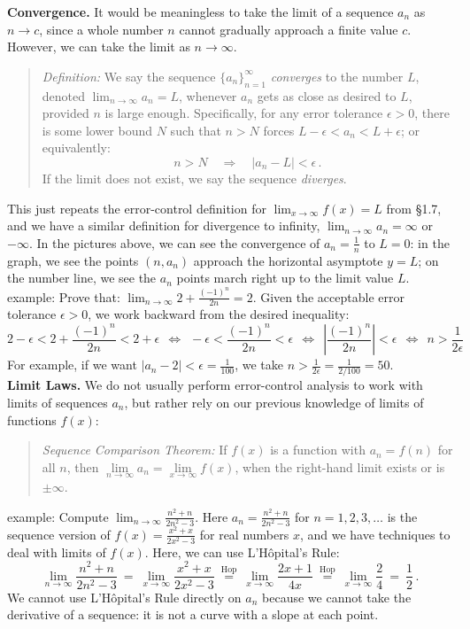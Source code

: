 \documentclass[11pt]{article}
\begin{document}
\noindent
{\bf Convergence.}  It would be meaningless to take the limit of a sequence $a_n$ as $n\to c$, since a whole number $n$ cannot gradually approach a finite value $c$. However, we can take the limit as $n\to\infty$.
\begin{quote}
{\it Definition:} We say the sequence $\{a_n\}_{n=1}^\infty$ {\it converges} to the number $L$, 
denoted $\lim_{n\to\infty} a_n = L$,
whenever $a_n$ gets as close as desired to $L$,
provided $n$ is large enough. 
Specifically, for any error tolerance $\epsilon>0$,
there is some lower bound $N$ such that
$n>N$ forces $L-\epsilon < a_n < L+\epsilon$;
or equivalently:
$$
n>N \quad\Longrightarrow\quad |a_n-L|<\epsilon\,.
$$
If the limit does not exist, we say the sequence {\it diverges}.
\end{quote}
This just repeats the error-control definition for $\lim_{x\to\infty} f(x)=L$
from \S1.7, and we have a similar definition for divergence to infinity, $\lim_{n\to\infty} a_n=\infty$ or $-\infty$.
In the pictures above, we can see the convergence of $a_n=\frac1n$ to $L=0$: in the graph, we see the 
points $(n,a_n)$ approach the horizontal asymptote $y=L$;
on the number line, we see the $a_n$ points march right up to the limit value $L$.
\\[.5em]
{\sc example:} Prove that:
$\lim_{n\to\infty} 2+\frac{(-1)^n}{2n} = 2$.
Given the acceptable error tolerance $\epsilon>0$, 
we work backward from the desired inequality:
$$
2-\epsilon < 2+\frac{(-1)^n}{2n} < 2 + \epsilon
 \ \ \Longleftrightarrow \ \ 
-\epsilon < \frac{(-1)^n}{2n} < \epsilon 
\ \ \Longleftrightarrow \ \ 
\left|\frac{(-1)^n}{2n}\right| < \epsilon
\ \ \Longleftrightarrow \ \ 
n> \frac{1}{2\epsilon}
$$
For example, if we want $|a_n-2|<\epsilon=\frac1{100}$, we take $n>\frac{1}{2\epsilon}=\frac{1}{2/100} = 50$.
\\[1em]
{\bf Limit Laws.} We do not usually perform error-control analysis to work
with limits of sequences $a_n$, but rather rely on our previous knowledge of limits
of functions $f(x)$: 
\begin{quote}
{\it Sequence Comparison Theorem:} If $f(x)$ is a function with $a_n=f(n)$ for all $n$, then $\lim\limits_{n\to\infty} a_n=\lim\limits_{x\to\infty} f(x)$, when the right-hand limit exists or is $\pm\infty$.
\end{quote}
%
{\sc example:} Compute $\lim_{n\to\infty} \frac{n^2+n}{2n^2-3}$. Here $a_n=\frac{n^2+n}{2n^2-3}$
for $n=1,2,3,\ldots$ is the sequence version of $f(x)=\frac{x^2+x}{2x^2-3}$ for
real numbers $x$, and we have techniques to deal with limits of $f(x)$.
Here, we can use L'H\^opital's Rule:
$$
\lim_{n\to\infty} \frac{n^2+n}{2n^2-3}
\ =\
\lim_{x\to\infty}\frac{x^2+x}{2x^2-3}
\ \stackrel{\mathrm{Hop}}{=}\ 
\lim_{x\to\infty}\frac{2x+1}{4x}
\ \stackrel{\mathrm{Hop}}{=}\ 
\lim_{x\to\infty}\frac{2}{4}
\ =\ \frac12\,.
$$
We cannot use L'H\^opital's Rule directly on $a_n$ because we cannot take the derivative of a sequence: it is not a curve with a slope at each point.
\\[-.5em]
\end{document}
